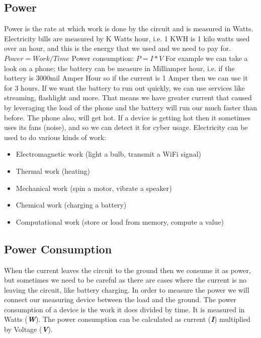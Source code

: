 \subsection{Power}
Power is the rate at which work is done by the circuit and is measured in Watts. Electricity bills are measured by K Watts hour, i.e. 1 KWH is 1 kilo watts used over an hour, and this is the energy that we used and we need to pay for.
$Power = Work / Time$
\newline
Power consumption: $P=I*V$
For example we can take a look on a phone; the battery can be measure in Milliamper hour, i.e. if the battery is 3000mil Amper Hour so if the current is 1 Amper then we can use it for 3 hours. If we want the battery to run out quickly, we can use services like streaming, flashlight and more. That means we have greater current that caused by leveraging the load of the phone and the battery will run our much faster than before. The phone also, will get hot. If a device is getting hot then it sometimes uses its fans (noise), and so we can detect it for cyber usage.
\newline
Electricity can be used to do various kinds of work:
\begin{itemize}
    \item Electromagnetic work (light a bulb, transmit a WiFi signal)
    \item Thermal work (heating)
    \item Mechanical work (spin a motor, vibrate a speaker)
    \item Chemical work (charging a battery)
    \item Computational work (store or load from memory, compute a value)
\end{itemize}
\subsection{Power Consumption}
When the current leaves the circuit to the ground then we consume it as power, but sometimes we need to be careful as there are cases where the current is no leaving the circuit, like battery charging. In order to measure the power we will connect our measuring device between the load and the ground.
The power consumption of a device is the work it does divided by time. It is measured in Watts (\textbf{\textit{W}}).
The power consumption can be calculated as current (\textbf{\textit{I}}) multiplied by Voltage (\textbf{\textit{V}}).
